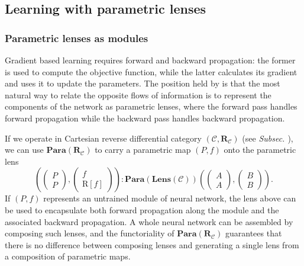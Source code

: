 \documentclass[12pt,a4paper,openright,twoside]{report}
\theoremstyle{plain}
\theoremstyle{definition}
\begin{document}
\subsection{Learning with parametric lenses}

\subsubsection{Parametric lenses as modules}

Gradient based learning requires forward and backward propagation: the former is used to compute the objective function, while the latter calculates its gradient and uses it to update the parameters.
The position held by \cite{cruttwell2022categorical} is that the most natural way to relate the opposite flows of information is to represent the components of the network as parametric lenses, where the forward pass handles forward propagation while the backward pass handles backward propagation.


If we operate in Cartesian reverse differential category $(\mathcal{C}, \mathbf{R}_{\mathcal{C}})$ (see \textit{Subsec. \cite{subsec: diffcats}}), we can use $\mathbf{Para}(\mathbf{R}_{\mathcal{C}})$ to carry a parametric map $(P,f)$ onto the parametric lens
\begin{equation}
  \label{eq: exparametriclens}
  \left(\begin{pmatrix} P \\ P \end{pmatrix},\begin{pmatrix} f \\ \mathrm{R}[f] \end{pmatrix}\right) 
  : \mathbf{Para}(\mathbf{Lens}(\mathcal{C}))
  \left(\begin{pmatrix} A \\ A \end{pmatrix},\begin{pmatrix} B \\ B \end{pmatrix}\right).
\end{equation}
If $(P,f)$ represents an untrained module of neural network, the lens above can be used to encapsulate both forward propagation along the module and the associated backward propagation.  A whole neural network can be assembled by composing such lenses, and the functoriality of $\mathbf{Para}(\mathbf{R}_{\mathcal{C}})$ guarantees that there is no difference between composing lenses and generating a single lens from a composition of parametric maps.
\end{document}
